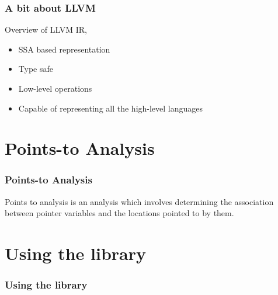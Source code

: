 \documentclass{beamer}
\begin{document}
\begin{frame}
\frametitle{A bit about LLVM}
Overview of LLVM IR,
\begin{itemize}
	\item<1-> SSA based representation
	\item<2-> Type safe
	\item<3-> Low-level operations
	\item<4-> Capable of representing all the high-level languages
\end{itemize}

\end{frame}

\section{Points-to Analysis}

\begin{frame}
\frametitle{Points-to Analysis}

Points to analysis is an analysis which involves determining the association between
pointer variables and the locations pointed to by them.

\end{frame}



\section{Using the library}
\begin{frame}
\frametitle{Using the library}
\end{frame}
\end{document}
